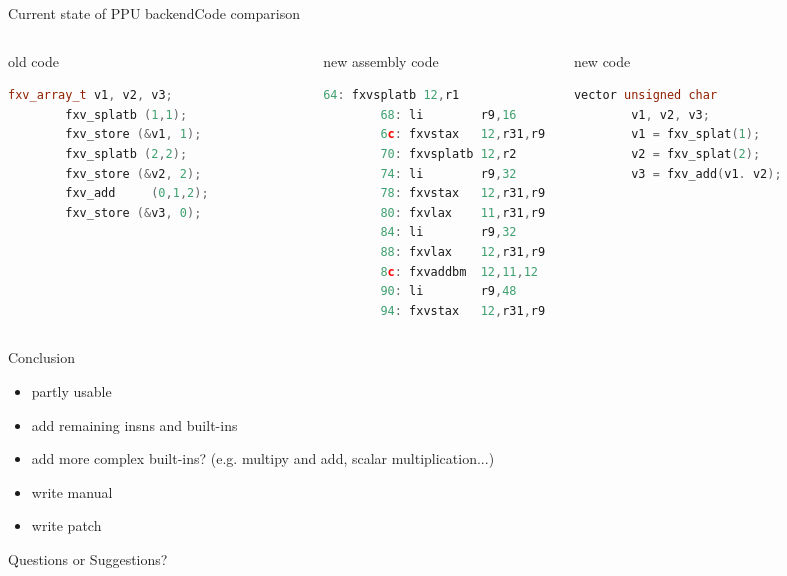 \documentclass[10pt]{beamer}
\begin{document}
\begin{frame}[fragile]{Current state of PPU backend}{Code comparison}
\begin{columns}[t]
	\begin{column}{0.3\textwidth}
      \begin{block}{old code}
       \begin{lstlisting}[language=C++,basicstyle=\ttfamily\scriptsize,keywordstyle=\color{red}]
		fxv_array_t v1, v2, v3;
		fxv_splatb (1,1);
		fxv_store (&v1, 1);
		fxv_splatb (2,2);
		fxv_store (&v2, 2);
		fxv_add 	(0,1,2);
		fxv_store (&v3, 0);				
	\end{lstlisting}
      \end{block}
    \end{column}    
    \begin{column}{0.3\textwidth}
      \begin{block}{new assembly code}
        \begin{lstlisting}[language=C++,basicstyle=\ttfamily\scriptsize,keywordstyle=\color{red}]
		64: fxvsplatb 12,r1 
		68: li        r9,16
		6c: fxvstax   12,r31,r9
		70: fxvsplatb 12,r2
		74: li        r9,32
		78: fxvstax   12,r31,r9
		80: fxvlax    11,r31,r9
		84: li        r9,32
		88: fxvlax    12,r31,r9
		8c: fxvaddbm  12,11,12
		90: li        r9,48
		94: fxvstax   12,r31,r9
	\end{lstlisting}
      \end{block}
    \end{column}
    \begin{column}{0.3\textwidth}
      \begin{block}{new code}
        \begin{lstlisting}[language=C++,basicstyle=\ttfamily\scriptsize,keywordstyle=\color{red}]
		vector unsigned char
		v1, v2, v3;
		v1 = fxv_splat(1);
		v2 = fxv_splat(2);	
		v3 = fxv_add(v1. v2);			
	\end{lstlisting}
      \end{block}
    \end{column}
\end{columns}
\end{frame}

\begin{frame}{Conclusion}
	\begin{itemize}
		\item partly usable
		\item add remaining insns and built-ins
		\item add more complex built-ins? (e.g. multipy and add, scalar multiplication...)
		\item write manual
		\item write patch
	\end{itemize}
\end{frame}

\begin{frame}[plain,c]
\begin{center}
\Huge Questions or Suggestions?
\end{center}
\end{frame}
\end{document}
